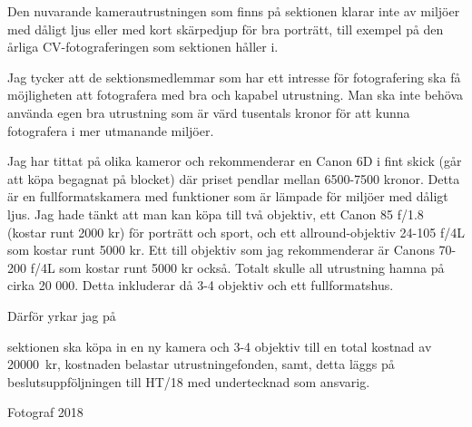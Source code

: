 \documentclass[../_main/handlingar.tex]{subfiles}
\begin{document}

Den nuvarande kamerautrustningen som finns på sektionen klarar inte av miljöer med dåligt ljus eller med kort skärpedjup för bra porträtt, till exempel på den årliga CV-fotograferingen som sektionen håller i. 

Jag tycker att de sektionsmedlemmar som har ett intresse för fotografering ska få möjligheten att fotografera med bra och kapabel utrustning. Man ska inte behöva använda egen bra utrustning som är värd tusentals kronor för att kunna fotografera i mer utmanande miljöer.

Jag har tittat på olika kameror och rekommenderar en Canon 6D i fint skick (går att köpa begagnat på blocket) där priset pendlar mellan 6500-7500 kronor. Detta är en fullformatskamera med funktioner som är lämpade för miljöer med dåligt ljus.
Jag hade tänkt att man kan köpa till två objektiv, ett Canon 85 f/1.8 (kostar runt 2000 kr) för porträtt och sport, och ett allround-objektiv 24-105 f/4L som kostar runt 5000 kr. Ett till objektiv som jag rekommenderar är Canons 70-200 f/4L som kostar runt 5000 kr också. Totalt skulle all utrustning hamna på cirka 20 000. Detta inkluderar då 3-4 objektiv och ett fullformatshus.

Därför yrkar jag på

\begin{attsatser}
    \att sektionen ska köpa in en ny kamera och 3-4 objektiv till en total kostnad av \SI{20000}{kr}, 
    \att kostnaden belastar utrustningefonden, samt,
    \att detta läggs på beslutsuppföljningen till HT/18 med undertecknad som ansvarig.
\end{attsatser}

\begin{signatures}{1}
    \mvh
    \signature{Eltayeb Bayomi}{Fotograf 2018}
\end{signatures}
\end{document}
